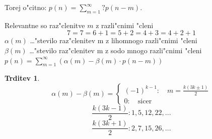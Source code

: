 \documentclass[a4paper,12pt]{article}
\theoremstyle{definition}
\newtheorem{claim}[counter]{Trditev}
\theoremstyle{remark}
\begin{document}
\label{TODO: fill in the question mark}
Torej o"citno: $p(n) = \displaystyle\sum_{m=1}^{\infty} ? p(n - m)$.

Relevantne so raz"clenitve $m$ z razli"cnimi "cleni
\[7 = 7 = 6 + 1 = 5 + 2 = 4 + 3 = 4 + 2 + 1\]
$\alpha(m)$ \ldots "stevilo raz"clenitev m z lihomnogo razli"cnimi "cleni\\
$\beta(m)$ \ldots "stevilo raz"clenitev m z sodo mnogo razli"cnimi "cleni\\
$p(n) = \sum_{m = 1}^{\infty} (\alpha(m) - \beta (m)\cdot p(n - m))$

\begin{claim}
\[\alpha(m) - \beta(m) = \begin{cases}(-1)^{k - 1}: \quad m = \frac{k (3k \pm 1)}{2}  \\ 0: \quad \text{sicer} \end{cases}\]
\[\frac{k (3k - 1)}{2}: 1, 5, 12, 22, ...\]
\[\frac{k (3k + 1)}{2}: 2, 7, 15, 26, ...\]
\end{claim}
\end{document}
